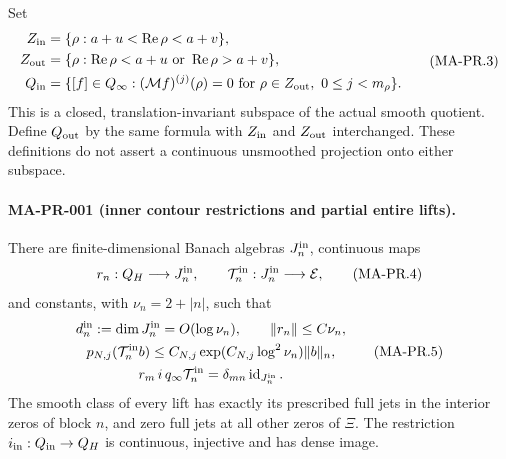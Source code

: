 Set
\[
\begin{aligned}
 Z_{\rm in}&=\{\rho:a+u<\operatorname{Re}\rho<a+v\},\\
 Z_{\rm out}&=\{\rho:\operatorname{Re}\rho<a+u
                         \text{ or }\operatorname{Re}\rho>a+v\},\\
 Q_{\rm in}
   &=\{[f]\in Q_\infty:
       (\mathcal Mf)^{(j)}(\rho)=0
       \text{ for }\rho\in Z_{\rm out},\ 0\le j<m_\rho\}.
\end{aligned}
\tag{MA-PR.3}
\]
This is a closed, translation-invariant subspace of the actual
smooth quotient.  Define $Q_{\rm out}$ by the same formula with
$Z_{\rm in}$ and $Z_{\rm out}$ interchanged.  These definitions
do not assert a continuous unsmoothed projection onto either
subspace.

\paragraph{MA-PR-001 (inner contour restrictions and partial entire lifts).}
There are finite-dimensional Banach algebras $J_n^{\rm in}$,
continuous maps
\[
 r_n:Q_H\longrightarrow J_n^{\rm in},
 \qquad \mathcal T_n^{\rm in}:J_n^{\rm in}\longrightarrow\mathcal E,
\tag{MA-PR.4}
\]
and constants, with $\nu_n=2+|n|$, such that
\[
\begin{gathered}
 d_n^{\rm in}:=\dim J_n^{\rm in}=O(\log\nu_n),\qquad
             \|r_n\|\le C\nu_n,\\
 p_{N,j}(\mathcal T_n^{\rm in}b)
        \le C_{N,j}\exp(C_{N,j}\log^2\nu_n)\|b\|_n,\\
 r_m\,i\,q_\infty\mathcal T_n^{\rm in}
        =\delta_{mn}\operatorname{id}_{J_n^{\rm in}}.
\end{gathered}
\tag{MA-PR.5}
\]
The smooth class of every lift has exactly its prescribed
full jets in the interior zeros of block $n$, and zero full
jets at all other zeros of $\Xi$.
The restriction $i_{\rm in}:Q_{\rm in}\to Q_H$ is continuous,
injective and has dense image.

